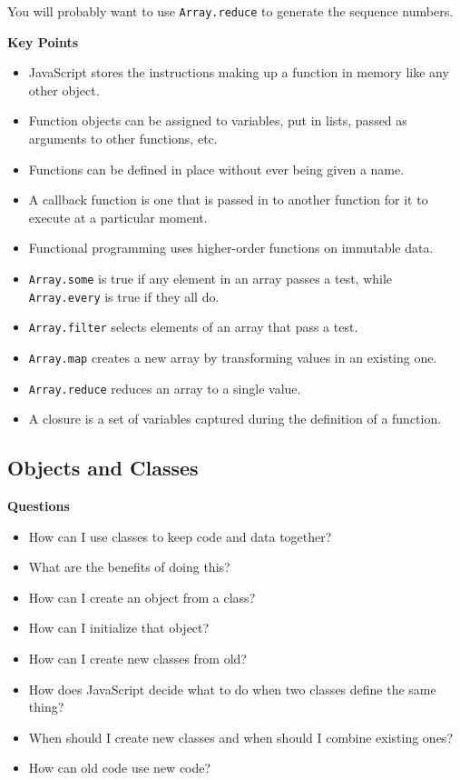 You will probably want to use \texttt{Array.reduce} to generate the
sequence numbers.

\textbf{Key Points}

\begin{itemize}
\tightlist
\item
  JavaScript stores the instructions making up a function in memory like
  any other object.
\item
  Function objects can be assigned to variables, put in lists, passed as
  arguments to other functions, etc.
\item
  Functions can be defined in place without ever being given a name.
\item
  A callback function is one that is passed in to another function for
  it to execute at a particular moment.
\item
  Functional programming uses higher-order functions on immutable data.
\item
  \texttt{Array.some} is true if any element in an array passes a test,
  while \texttt{Array.every} is true if they all do.
\item
  \texttt{Array.filter} selects elements of an array that pass a test.
\item
  \texttt{Array.map} creates a new array by transforming values in an
  existing one.
\item
  \texttt{Array.reduce} reduces an array to a single value.
\item
  A closure is a set of variables captured during the definition of a
  function.
\end{itemize}

\hypertarget{s:oop}{\subsection{Objects and Classes}\label{s:oop}}

\textbf{Questions}

\begin{itemize}
\tightlist
\item
  How can I use classes to keep code and data together?
\item
  What are the benefits of doing this?
\item
  How can I create an object from a class?
\item
  How can I initialize that object?
\item
  How can I create new classes from old?
\item
  How does JavaScript decide what to do when two classes define the same
  thing?
\item
  When should I create new classes and when should I combine existing
  ones?
\item
  How can old code use new code?
\end{itemize}

